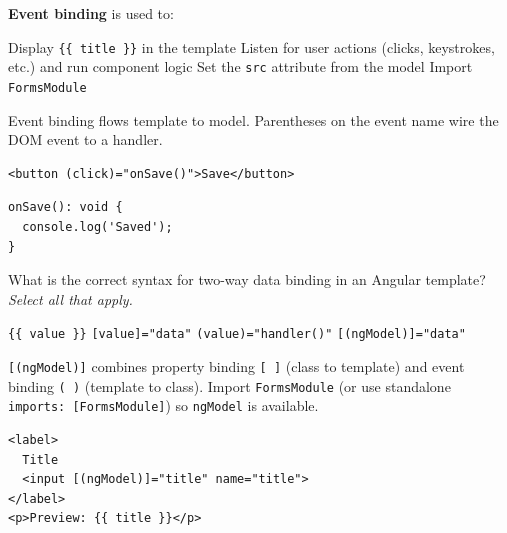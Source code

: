 \newpage



\question[4]
\textbf{Event binding} is used to:
\begin{choices}
  \choice Display \lstinline[style=htmlinline]|{{ title }}| in the template
  \CorrectChoice Listen for user actions (clicks, keystrokes, etc.) and run component logic
  \choice Set the \lstinline[style=htmlinline]|src| attribute from the model
  \choice Import \lstinline[style=tsinline]|FormsModule|
\end{choices}
\begin{solution}
  Event binding flows template to model. Parentheses on the event name wire the DOM event to a handler.
\begin{lstlisting}[style=htmlinline]
<button (click)="onSave()">Save</button>
\end{lstlisting}
\begin{lstlisting}[style=ts]
onSave(): void {
  console.log('Saved');
}
\end{lstlisting}
\end{solution}


\question[4]
What is the correct syntax for two-way data binding in an Angular template? \emph{Select all that apply.}
\begin{checkboxes}
  \choice \lstinline[style=htmlinline]|{{ value }}|
  \choice \lstinline[style=htmlinline]|[value]="data"|
  \choice \lstinline[style=htmlinline]|(value)="handler()"|
  \CorrectChoice \lstinline[style=htmlinline]|[(ngModel)]="data"|
\end{checkboxes}
\begin{solution}
  \lstinline[style=htmlinline]|[(ngModel)]| combines property binding \lstinline[style=htmlinline]|[ ]| (class to template) and event binding \lstinline[style=htmlinline]|( )| (template to class). Import \lstinline[style=tsinline]|FormsModule| (or use standalone \lstinline[style=tsinline]|imports: [FormsModule]|) so \lstinline[style=htmlinline]|ngModel| is available.
\begin{lstlisting}[style=htmlinline]
<label>
  Title
  <input [(ngModel)]="title" name="title">
</label>
<p>Preview: {{ title }}</p>
\end{lstlisting}
\end{solution}

